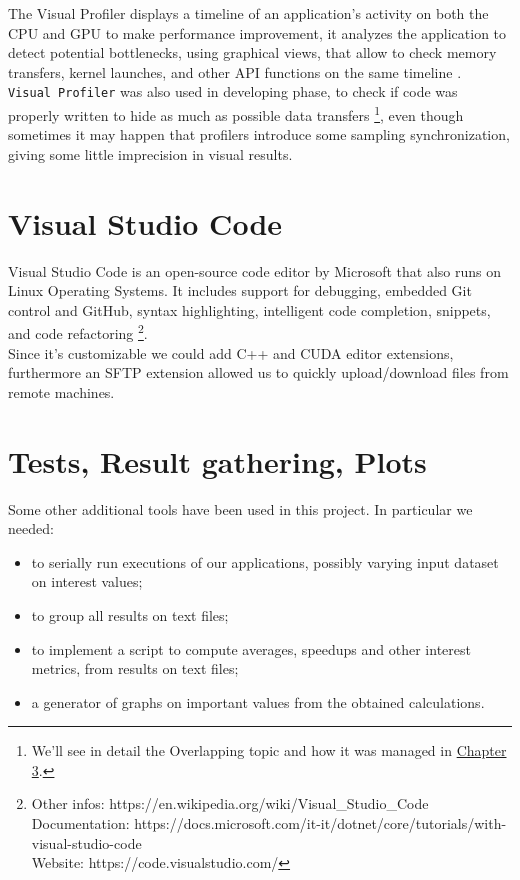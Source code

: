 	The Visual Profiler displays a timeline of an application's activity on both the CPU and GPU to make performance improvement, it analyzes the application to detect potential bottlenecks, using graphical views, that allow to check memory transfers, kernel launches, and other API functions on the same timeline \cite{profilersguide}.\\
	 
	\texttt{Visual Profiler} was also used in developing phase, to check if code was properly written to hide as much as possible data transfers \footnote{We'll see in detail the Overlapping topic and how it was managed in \hyperref[chap:logic]{Chapter 3}.}, even though sometimes it may happen that profilers introduce some sampling synchronization, giving some little imprecision in visual results.

	
\section{Visual Studio Code}
	Visual Studio Code is an open-source code editor by Microsoft that also runs on Linux Operating Systems. It includes support for debugging, embedded Git control and GitHub, syntax highlighting, intelligent code completion, snippets, and code refactoring \footnote{Other infos: https://en.wikipedia.org/wiki/Visual\_Studio\_Code \\
		Documentation: https://docs.microsoft.com/it-it/dotnet/core/tutorials/with-visual-studio-code \\ 
		Website: https://code.visualstudio.com/}.\\
	Since it's customizable we could add C++ and CUDA editor extensions, furthermore an SFTP extension allowed us to quickly upload/download files from remote machines. 	
	
	
\section{Tests, Result gathering, Plots}
	Some other additional tools have been used in this project.
	In particular we needed:
	\begin{itemize}
		\item to serially run executions of our applications, possibly varying input dataset on interest values;
		\item to group all results on text files;
		\item to implement a script to compute averages, speedups and other interest metrics, from results on text files;
		\item a generator of graphs on important values from the obtained calculations.
	\end{itemize}
	
